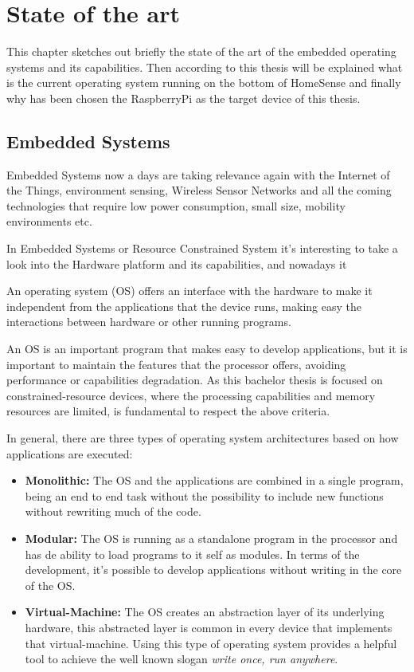 \chapter{State of the art}\label{C:State-Art}

This chapter sketches out briefly the state of the art of the embedded operating systems and its capabilities. Then according to this thesis will be explained what is the current operating system running on the bottom of HomeSense and finally why has been chosen the RaspberryPi as the target device of this thesis.

\section{Embedded Systems}\label{S:Embedded-Systems}
Embedded Systems now a days are taking relevance again with the Internet of the Things, environment sensing, Wireless Sensor Networks and all the coming technologies that require low power consumption, small size, mobility environments etc.

In Embedded Systems or Resource Constrained System it's interesting to take a look into the Hardware platform and its capabilities, and nowadays it 


An operating system (OS) offers an interface with the hardware to make it independent from the applications that the device runs, making easy the interactions between hardware or other running programs.

An OS is an important program that makes easy to develop applications, but it is important to maintain the features that the processor offers, avoiding performance or capabilities degradation. As this bachelor thesis is focused on constrained-resource devices, where the processing capabilities and memory resources are limited, is fundamental to respect the above criteria.

In general, there are three types of operating system architectures based on how applications are executed:

\begin{itemize}
\item \textbf{Monolithic:} The OS and the applications are combined in a single program, being an end to end task without the possibility to include new functions without rewriting much of the code.

\item \textbf{Modular:} The OS is running as a standalone program in the processor and has de ability to load programs to it self as modules. In terms of the development, it's possible to develop applications without writing in the core of the OS.

\item \textbf{Virtual-Machine:} The OS creates an abstraction layer of its underlying hardware, this abstracted layer is common in every device that implements that virtual-machine. Using this type of operating system provides a helpful tool to achieve the well known slogan \textit{write once, run anywhere}. 
\end{itemize}


